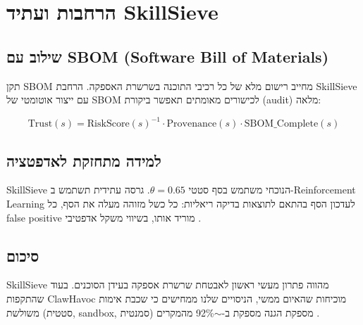 
\clearpage
\chapter{הרחבות ועתיד \textenglish{SkillSieve}}

\section{שילוב עם \textenglish{SBOM} (\textenglish{Software Bill of Materials})}

תקן \textenglish{SBOM} מחייב רישום מלא של כל רכיבי התוכנה בשרשרת האספקה. הרחבת \textenglish{SkillSieve} עם ייצור אוטומטי של \textenglish{SBOM} לכישורים מאומתים תאפשר ביקורת (\textenglish{audit}) מלאה:

\begin{equation}
\text{Trust}(s) = \text{RiskScore}(s)^{-1} \cdot \text{Provenance}(s) \cdot \text{SBOM\_Complete}(s)
\end{equation}

\section{למידה מתחזקת לאדפטציה}

\textenglish{SkillSieve} הנוכחי משתמש בסף סטטי \(\theta = 0.65\). גרסה עתידית תשתמש ב-\textenglish{Reinforcement Learning} לעדכון הסף בהתאם לתוצאות בדיקה ריאליות: כל כשל מזוהה מעלה את הסף, כל \textenglish{false positive} מוריד אותו, בשיווי משקל אדפטיבי \cite{liu2023prompt}.

\section{סיכום}

\textenglish{SkillSieve} מהווה פתרון מעשי ראשון לאבטחת שרשרת אספקה בעידן הסוכנים. בעוד שהתקפות \textenglish{ClawHavoc} מוכיחות שהאיום ממשי, הניסויים שלנו ממחישים כי שכבת אימות משולשת (סטטית, \textenglish{sandbox}, סמנטית) מספקת הגנה מספקת ב-\textenglish{$\sim$92\%} מהמקרים \cite{nakash2024skillsieve}.

